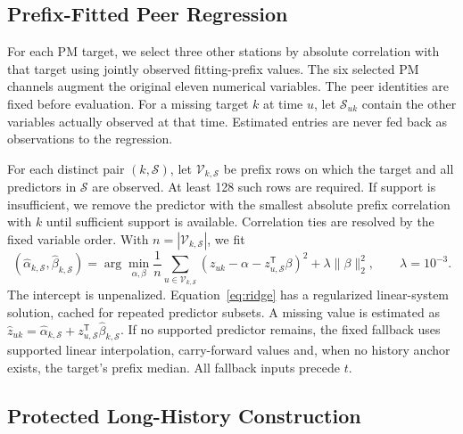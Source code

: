 \subsection{Prefix-Fitted Peer Regression}

For each PM target, we select three other stations by absolute correlation with that target using jointly observed fitting-prefix values. The six selected PM channels augment the original eleven numerical variables. The peer identities are fixed before evaluation. For a missing target $k$ at time $u$, let $\mathcal S_{uk}$ contain the other variables actually observed at that time. Estimated entries are never fed back as observations to the regression.

For each distinct pair $(k,\mathcal S)$, let $\mathcal V_{k,\mathcal S}$ be prefix rows on which the target and all predictors in $\mathcal S$ are observed. At least 128 such rows are required. If support is insufficient, we remove the predictor with the smallest absolute prefix correlation with $k$ until sufficient support is available. Correlation ties are resolved by the fixed variable order. With $n=|\mathcal V_{k,\mathcal S}|$, we fit
\begin{equation}
 (\widehat\alpha_{k,\mathcal S},\widehat\beta_{k,\mathcal S})
 =\arg\min_{\alpha,\beta}\frac1n\sum_{u\in\mathcal V_{k,\mathcal S}}
 (z_{uk}-\alpha-z_{u,\mathcal S}^{\mathsf T}\beta)^2
 +\lambda\|\beta\|_2^2,\qquad \lambda=10^{-3}.
 \label{eq:ridge}
\end{equation}
The intercept is unpenalized. Equation~\ref{eq:ridge} has a regularized linear-system solution, cached for repeated predictor subsets. A missing value is estimated as $\widehat z_{uk}=\widehat\alpha_{k,\mathcal S}+z_{u,\mathcal S}^{\mathsf T}\widehat\beta_{k,\mathcal S}$. If no supported predictor remains, the fixed fallback uses supported linear interpolation, carry-forward values and, when no history anchor exists, the target's prefix median. All fallback inputs precede $t$.

\subsection{Protected Long-History Construction}

